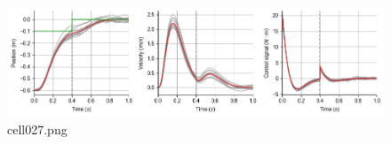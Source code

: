 \begin{figure}[ht]
	\centering
	\includegraphics[scale=0.8, max width=\linewidth]{./fig/motor-learning/infinite-horizon-ofc/cell027.png}
	\caption{cell027.png}
	\label{cell027.png}
\end{figure}